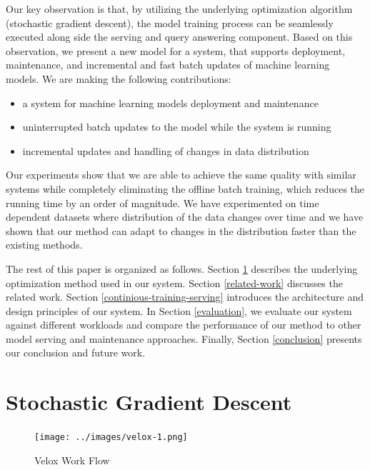 \documentclass{vldb}
\begin{document}
Our key observation is that, by utilizing the underlying optimization algorithm (stochastic gradient descent), the model training process can be seamlessly executed along side the serving and query answering component.
Based on this observation, we present a new model for a system, that supports deployment, maintenance, and incremental and fast batch updates of machine learning models.
We are making the following contributions: 
\begin{itemize}
\item a system for machine learning models deployment and maintenance
\item uninterrupted batch updates to the model while the system is running
\item incremental updates and handling of changes in data distribution
\end{itemize}
Our experiments show that we are able to achieve the same quality with similar systems while completely eliminating the offline batch training, which reduces the running time by an order of magnitude. 
We have experimented on time dependent datasets where distribution of the data changes over time and we have shown that our method can adapt to changes in the distribution faster than the existing methods.

The rest of this paper is organized as follows. 
Section \ref{sgd} describes the underlying optimization method used in our system. 
Section \ref {related-work} discusses the related work.
Section \ref{continious-training-serving} introduces the architecture and design principles of our system. 
In Section \ref{evaluation}, we evaluate our system against different workloads and compare the performance of our method to other model serving and maintenance approaches. 
Finally, Section \ref{conclusion} presents our conclusion and future work.

\section{Stochastic Gradient Descent} \label{sgd}
\begin{figure}[!t]
\centering
\texttt{[image: ../images/velox-1.png]}
\caption{Velox Work Flow}
\label{fig:velox-work-flow}
\end{figure}
\end{document}
